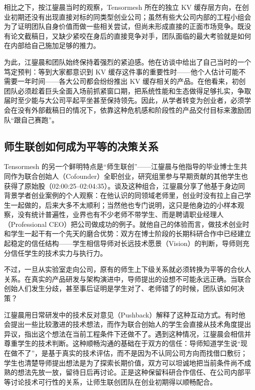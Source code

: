 \documentclass[UTF8,a4paper,11pt,fontset=fandol]{ctexart}
\begin{document}
相比之下，按江鋆晨当时的观察，Tensormesh 所在的独立 KV 缓存层方向，在创业初期还没有出现直接对标的同类型创业公司；虽然有些大公司内部的工程小组会为了证明团队自身价值而做一些相关尝试，但尚未形成直接的正面市场竞争。既没有论文截稿日，又缺少紧咬在身后的直接竞争对手，团队面临的最大考验就是如何在内部给自己施加足够的推力。

为此，江鋆晨和团队始终保持着强烈的紧迫感。他在访谈中给出了自己当时的一个笃定预判：等到大家都意识到 KV 缓存这件事的重要性时——他个人估计可能不需要一年时间——各大公司都会纷纷推出 KV 缓存相关的产品。在他看来，初创团队必须趁着巨头全面入场前抓紧窗口期，把系统性能和生态做得足够扎实，争取届时至少能与大公司平起平坐甚至保持领先。因此，从学者转变为创业者，必须学会在没有外部截稿日的情况下，依靠这种危机感和阶段性的产品交付目标来激励团队“跟自己赛跑”。

\subsection{师生联创如何成为平等的决策关系}
Tensormesh 的另一个鲜明特点是“师生联创”——江鋆晨与他指导的毕业博士生共同作为联合创始人（Cofounder）全职创业，研究组里参与早期贡献的其他学生也获得了原始股（02:00:25–02:04:35）。谈及这种组合，江鋆晨分享了他基于身边同背景学者创业案例的个人观察：在他认识的同领域老师里，创业时没有拉上自己学生一起做的，后来大多不太顺利；当然他也专门说明，这只是他身边的小样本观察，没有统计普遍性，业界也有不少老师不带学生、而是聘请职业经理人（Professional CEO）把公司做成功的例子。就他自己的体验而言，做技术创业时和学生一起干有一个先天的磨合优势：双方在博士阶段的长期科研合作中已经建立起稳定的信任结构——学生相信导师对长远技术愿景（Vision）的判断，导师则充分信任学生的技术实力与执行力。

不过，一旦从实验室走向公司，原有的师生上下级关系就必须转换为平等的合伙人关系。在真实的产品研发与架构演进中，导师提出的设想不可能永远正确。当联合创始人们发生分歧，甚至事后证明是学生对了、老师错了的时候，团队该如何决策？

江鋆晨用日常研发中的技术反对意见（Pushback）解释了这种互动方式。有时他会提出一些比较激进的技术想法，而作为联合创始人的学生会直接从技术角度提出异议，指出这个想法在当前工程条件下还做不了。遇到这种情况，江鋆晨会相信并尊重学生的技术判断。这种顺畅沟通的基础在于双方的信任：导师知道学生说“现在做不了”，是基于真实的技术评估，而不是因为不认同公司方向而找借口敷衍；学生也清楚导师提出想法是为了探索长期价值，双方可以坦诚地把当前条件尚不成熟的想法先放一放，留待日后再讨论。正是这种保留科研合作信任、在公司内部平等讨论技术可行性的关系，让师生联创团队在创业初期得以顺畅配合。
\end{document}
